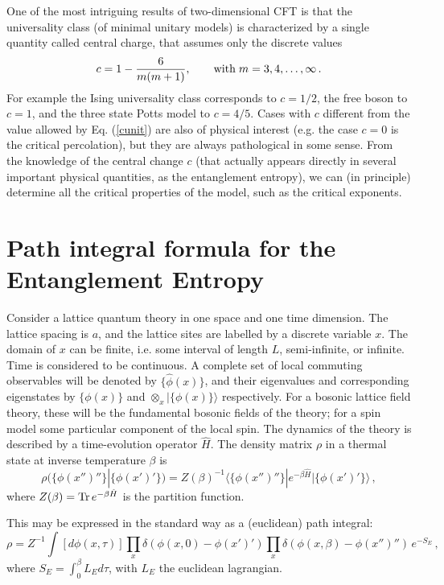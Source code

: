 \documentclass[12pt]{article}
\def\be{\begin{equation}}
\def\ee{\end{equation}}
\begin{document}
One of the most intriguing results\cite{confbook} of two-dimensional CFT is 
that the universality class (of minimal unitary models) 
is characterized by a single quantity called 
central charge, that assumes only the discrete values
\be
c=1-\frac{6}{m(m+1)}, \qquad {\rm with} \; m=3,4,\dots,\infty\,.
\label{cunit}
\ee
For example the Ising universality class corresponds to $c=1/2$, the 
free boson to $c=1$, and the three state Potts model to $c=4/5$.
Cases with $c$ different from the value allowed by Eq. (\ref{cunit})
are also of physical interest (e.g. the case $c=0$ is the critical 
percolation), but they are always pathological in some sense.
From the knowledge of the central change $c$ (that actually appears directly 
in several important physical quantities, as the entanglement 
entropy\cite{Holzhey}), we 
can (in principle) determine all the critical properties of the model, such as
the critical exponents.







\section{Path integral formula for the Entanglement Entropy}
\label{pathsec}

Consider a lattice quantum theory in one space and one time
dimension. The lattice spacing is $a$,
and the lattice sites are labelled by a discrete variable $x$. 
The domain of $x$ can be finite, i.e. some interval of length $L$, 
semi-infinite, or infinite. Time is considered to be continuous. 
A complete set of local
commuting observables will be denoted by $\{\hat\phi(x)\}$, and their
eigenvalues and corresponding eigenstates by $\{\phi(x)\}$ and
$\otimes_x|\{\phi(x)\}\rangle$ respectively. For a bosonic lattice
field theory,
these will be the fundamental bosonic fields of the theory; for a spin
model some particular component of the local spin. The dynamics of the
theory is described by a time-evolution operator $\hat H$. The density
matrix $\rho$ in a thermal state at inverse temperature $\beta$
is 
\begin{equation}
\rho(\{\phi(x'')''\}|\{\phi(x')'\})=
Z(\beta)^{-1}\langle\{\phi(x'')''\}|e^{-\beta\hat
H}|\{\phi(x')'\}\rangle\,,
\end{equation}
where $Z(\beta)={\rm Tr}\,e^{-\beta\hat H}$ is the partition function.

This may be expressed in the standard way
as a (euclidean) path integral:
\begin{equation}
\label{pathi}
\rho=Z^{-1}\int[d\phi(x,\tau)]
\prod_x\delta(\phi(x,0)-\phi(x')')\prod_x
\delta(\phi(x,\beta)-\phi(x'')'')\,e^{-S_E}\,,
\end{equation}
where $S_E=\int_0^\beta L_Ed\tau$, with $L_E$ the euclidean lagrangian. 
\end{document}
